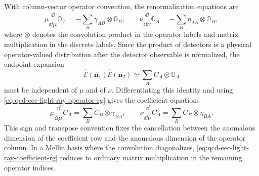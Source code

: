 With column-vector operator convention, the renormalization equations are
\begin{equation}
  \mu\frac{\dd}{\dd\mu}\mathbb O_A
  =
  -\sum_B \gamma_{AB}\otimes\mathbb O_B,\qquad
  \nu\frac{\dd}{\dd\nu}\mathbb O_A
  =
  -\sum_B \eta_{AB}\otimes\mathbb O_B ,
  \label{eq:qcd-eec-light-ray-operator-rg}
\end{equation}
where \(\otimes\) denotes the convolution product in the operator labels and
matrix multiplication in the discrete labels.  Since the product of
detectors is a physical operator-valued distribution after the detector
observable is normalized, the endpoint expansion
\[
  \widehat{\mathcal E}(\mathbf n_1)\widehat{\mathcal E}(\mathbf n_2)
  \simeq
  \sum_A C_A\otimes \mathbb O_A
\]
must be independent of \(\mu\) and of \(\nu\).  Differentiating this
identity and using \eqref{eq:qcd-eec-light-ray-operator-rg} gives the
coefficient equations
\begin{equation}
  \mu\frac{\dd}{\dd\mu}C_A
  =
  \sum_B C_B\otimes\gamma_{BA},\qquad
  \nu\frac{\dd}{\dd\nu}C_A
  =
  \sum_B C_B\otimes\eta_{BA}.
  \label{eq:qcd-eec-light-ray-coefficient-rg}
\end{equation}
This sign and transpose convention fixes the cancellation between the
anomalous dimension of the coefficient row and the anomalous dimension of the
operator column.  In a Mellin basis where the convolution diagonalizes,
\eqref{eq:qcd-eec-light-ray-coefficient-rg} reduces to ordinary matrix
multiplication in the remaining operator indices.

